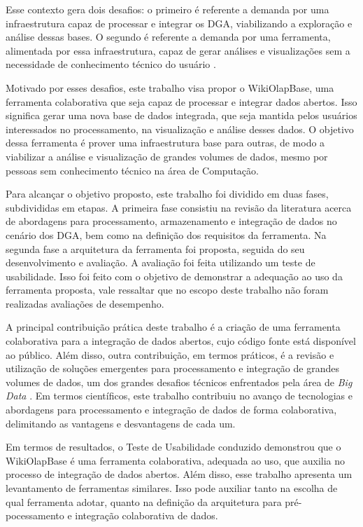 Esse contexto gera dois desafios: o primeiro é referente a demanda por uma infraestrutura 
capaz de processar e integrar os DGA, viabilizando a exploração e análise dessas bases. 
O segundo é referente a demanda por uma ferramenta, alimentada por essa infraestrutura, capaz 
de gerar análises e visualizações sem a necessidade de conhecimento técnico do usuário 
\cite{graves2013}.

Motivado por esses desafios, este trabalho visa propor o WikiOlapBase, uma ferramenta 
colaborativa que seja capaz de processar e integrar dados abertos. Isso significa gerar uma 
nova base de dados integrada, que seja mantida pelos usuários interessados no processamento, 
na visualização e análise desses dados. O objetivo dessa ferramenta é prover uma infraestrutura
base para outras, de modo a viabilizar a análise e visualização de grandes 
volumes de dados, mesmo por pessoas sem conhecimento técnico na área de Computação. 

Para alcançar o objetivo proposto, este trabalho foi dividido em duas fases, subdivididas 
em etapas. A primeira fase consistiu na revisão da literatura acerca de abordagens para 
processamento, armazenamento e integração de dados no cenário dos DGA, bem como na definição 
dos requisitos da ferramenta. Na segunda fase a arquitetura da ferramenta foi proposta, 
seguida do seu desenvolvimento e avaliação. A avaliação foi feita utilizando um teste de 
usabilidade. Isso foi feito com o objetivo de demonstrar a adequação ao uso da ferramenta
proposta, vale ressaltar que no escopo deste trabalho não foram realizadas avaliações de 
desempenho.

A principal contribuição prática deste trabalho é a criação de uma ferramenta colaborativa para
a integração de dados abertos, cujo código fonte está disponível ao público. Além disso, outra
contribuição, em termos práticos, é a revisão e utilização de soluções emergentes para
processamento e integração de grandes volumes de dados, um dos grandes desafios técnicos 
enfrentados pela área de \textit{Big Data} \cite{jagadish2014}. Em termos científicos, este
trabalho contribuiu no avanço de tecnologias e abordagens para processamento e integração
de dados de forma colaborativa, delimitando as vantagens e desvantagens de cada um.

Em termos de resultados, o Teste de Usabilidade conduzido demonstrou que o WikiOlapBase é uma
ferramenta colaborativa, adequada ao uso, que auxilia no processo de integração de dados 
abertos. Além disso, esse trabalho apresenta um levantamento de ferramentas similares. Isso
pode auxiliar tanto na escolha de qual ferramenta adotar, quanto na definição da arquitetura
para pré-pocessamento e integração colaborativa de dados.

